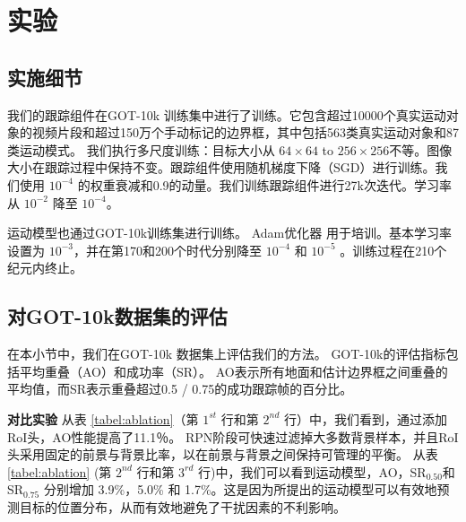 \section{实验}
\label{sec:experiments}

\subsection{实施细节}
我们的跟踪组件在GOT-10k \cite{GOT-10k} 训练集中进行了训练。它包含超过10000个真实运动对象的视频片段和超过150万个手动标记的边界框，其中包括563类真实运动对象和87类运动模式。
我们执行多尺度训练：目标大小从 $64 \times 64$ to $256 \times 256$不等。图像大小在跟踪过程中保持不变。跟踪组件使用随机梯度下降（SGD）进行训练。我们使用 $10^{-4}$ 的权重衰减和0.9的动量。我们训练跟踪组件进行27k次迭代。学习率从 $10^{-2}$ 降至 $10^{-4}$。

运动模型也通过GOT-10k训练集进行训练。 Adam优化器 \cite{kingma2014adam} 用于培训。基本学习率设置为 $10^{-3}$，并在第170和200个时代分别降至 $10^{-4}$ 和 $10^{-5}$ 。训练过程在210个纪元内终止。

\subsection{对GOT-10k数据集的评估}
在本小节中，我们在GOT-10k \cite{GOT-10k} 数据集上评估我们的方法。
GOT-10k的评估指标包括平均重叠（AO）和成功率（SR）。 AO表示所有地面和估计边界框之间重叠的平均值，而SR表示重叠超过0.5 / 0.75的成功跟踪帧的百分比。

\textbf{对比实验}
从表 \ref{tabel:ablation}（第 $1^{st}$ 行和第 $2^{nd}$ 行）中，我们看到，通过添加RoI头，AO性能提高了11.1％。 RPN阶段可快速过滤掉大多数背景样本，并且RoI头采用固定的前景与背景比率，以在前景与背景之间保持可管理的平衡。
从表 \ref{tabel:ablation} (第 $2^{nd}$ 行和第 $3^{rd}$ 行)中，我们可以看到运动模型，AO，SR$_{0.50}$和SR$_{0.75}$ 分别增加 3.9\%，5.0\% 和 1.7\%。这是因为所提出的运动模型可以有效地预测目标的位置分布，从而有效地避免了干扰因素的不利影响。

